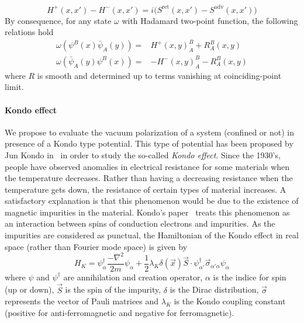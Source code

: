 \begin{equation*}
H^+(x,x') - H^-(x,x') = i\big(S^{\mathrm{ret}}(x,x') - S^{\mathrm{adv}}(x,x')\big)
\end{equation*}
By consequence, for any state $\omega$ with Hadamard two-point function, the following relations hold
\begin{equation*}
\begin{split}
\omega(\psi^B(x)\bar{\psi}_A(y)) = & H^+(x,y)^B_A + R^B_A(x,y) \\
\omega(\bar{\psi}_A(y)\psi^B(x)) = &- H^-(x,y)^B_A - R^B_A(x,y)
\end{split}
\end{equation*}
where $R$ is smooth and determined up to terms vanishing at coinciding-point limit.
%
%
%
\paragraph{Kondo effect}
We propose to evaluate the vacuum polarization of a system (confined or not) 
in presence of a Kondo type potential.
This type of potential has been proposed by Jun Kondo in~\cite{Kondo1964} in order to study the so-called \textit{Kondo effect}.
Since the 1930's, people have observed anomalies in electrical resistance for some materials when the temperature decreases. 
Rather than having a decreasing resistance when the temperature gets down,
the resistance of certain types of material increases. 
A satisfactory explanation is that this phenomenon would be due to the existence of magnetic impurities in the material. 
Kondo's paper~\cite{Kondo1964} treats this phenomenon as an interaction between spins of conduction electrons and impurities.
As the impurities are considered as punctual,
the Hamiltonian of the Kondo effect in real space (rather than Fourier mode space) is given by~\cite{Erdmenger2013}
\begin{equation*}
H_K = \psi_\alpha^\dagger \frac{-\nabla^2}{2m}\psi_\alpha +
\frac 1 2\lambda_K \delta(\vec{x})\vec{S}\cdot \psi_{\alpha'}^\dagger  \vec{\sigma}_{\alpha' \alpha} \psi_\alpha
\end{equation*}
where $\psi$ and $\psi^\dagger$ are annihilation and creation operator, 
$\alpha$ is the indice for spin (up or down), 
$\vec{S}$ is the spin of the impurity,
$\delta$ is the Dirac distribution,
$\vec{\sigma}$ represents the vector of Pauli matrices and $\lambda_K$ is the Kondo coupling constant (positive for anti-ferromagnetic and negative for ferromagnetic).
















